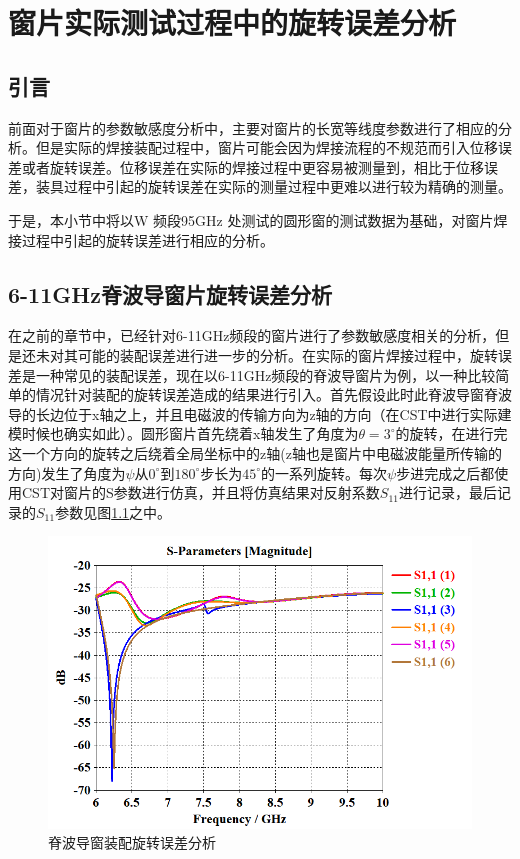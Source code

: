 \documentclass[master]{thesis-uestc}
\begin{document}
\chapter{窗片实际测试过程中的旋转误差分析}
\section{引言}
前面对于窗片的参数敏感度分析中，主要对窗片的长宽等线度参数进行了相应的分析。但是实际的焊接装配过程中，窗片可能会因为焊接流程的不规范而引入位移误差或者旋转误差。位移误差在实际的焊接过程中更容易被测量到，相比于位移误差，装具过程中引起的旋转误差在实际的测量过程中更难以进行较为精确的测量。

于是，本小节中将以W 频段95GHz 处测试的圆形窗的测试数据为基础，对窗片焊接过程中引起的旋转误差进行相应的分析。

\section{6-11GHz脊波导窗片旋转误差分析}\label{sec:6-11GHz脊波导窗片旋转误差分析}
在之前的章节中，已经针对6-11GHz频段的窗片进行了参数敏感度相关的分析，但是还未对其可能的装配误差进行进一步的分析。在实际的窗片焊接过程中，旋转误差是一种常见的装配误差，现在以6-11GHz频段的脊波导窗片为例，以一种比较简单的情况针对装配的旋转误差造成的结果进行引入。首先假设此时此脊波导窗脊波导的长边位于x轴之上，并且电磁波的传输方向为z轴的方向（在CST中进行实际建模时候也确实如此）。圆形窗片首先绕着x轴发生了角度为$\theta=3^ \circ $的旋转，在进行完这一个方向的旋转之后绕着全局坐标中的z轴(z轴也是窗片中电磁波能量所传输的方向)发生了角度为$\psi$从$0^ \circ$到$180^ \circ$步长为$45^ \circ$的一系列旋转。每次$\psi $步进完成之后都使用CST对窗片的S参数进行仿真，并且将仿真结果对反射系数$S_{11}$进行记录，最后记录的$S_{11}$参数见图\ref{fig:脊波导圆窗旋转}之中。
\begin{figure}[!htb]
    \centering
    \includegraphics[width=0.5\linewidth]{pic/chapter5/脊波导圆窗旋转.png}
    \caption{脊波导窗装配旋转误差分析}
    \label{fig:脊波导圆窗旋转}
\end{figure}
\end{document}
